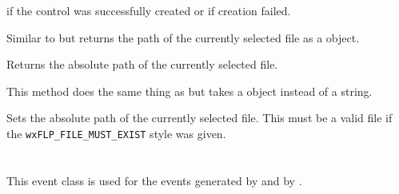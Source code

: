 

\true if the control was successfully created or \false if creation failed.


\label{wxfilepickerctrlgetfilename}


Similar to  but returns the path of
the currently selected file as a  object.


\label{wxfilepickerctrlgetpath}


Returns the absolute path of the currently selected file.


\label{wxfilepickerctrlsetfilename}


This method does the same thing as  but
takes a  object instead of a string.


\label{wxfilepickerctrlsetpath}


Sets the absolute path of the currently selected file. This must be a valid file if
the {\tt wxFLP\_FILE\_MUST\_EXIST} style was given.




\section{}\label{wxfiledirpickerevent}

This event class is used for the events generated by
 and by .


\\
\\

